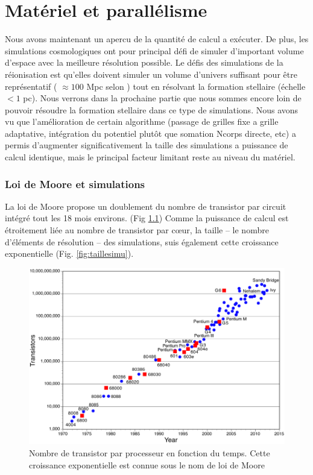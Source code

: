 \chapter{Matériel et parallélisme}

Nous avons maintenant un apercu de la quantité de calcul a exécuter.
De plus, les simulations cosmologiques ont pour principal défi de simuler d'important volume d'espace avec la meilleure résolution possible.
Le défis des simulations de la réionisation est qu'elles doivent simuler un volume d'univers suffisant pour être représentatif ( $\approx 100$ Mpc selon \cite{iliev_cosmological_2006}) tout en résolvant la formation stellaire (échelle $<1$ pc).
Nous verrons dans la prochaine partie que nous sommes encore loin de pouvoir résoudre la formation stellaire dans ce type de simulations. %
Nous avons vu que l'amélioration de certain algorithme (passage de grilles fixe a grille adaptative, intégration du potentiel plutôt que somation Ncorps directe, etc) a permis d'augmenter significativement la taille des simulations a puissance de calcul identique, mais le principal facteur limitant reste au niveau du matériel.

\subsection{Loi de Moore et simulations}
La loi de Moore \citep{moore1965cramming} propose un doublement du nombre de transistor par circuit intégré tout les 18 mois environs. (Fig \ref{fig:moore})
Comme la puissance de calcul est étroitement liée au nombre de transistor par cœur, la taille -- le nombre d'éléments de résolution -- des simulations, suis également cette croissance exponentielle (Fig. \ref{fig:taillesimu}).

\begin{figure}[bth]
        \includegraphics[width=.95\linewidth]{img/02/moorelaw.png} 
        \caption{Nombre de transistor par processeur en fonction du temps.
        Cette croissance exponentielle est connue sous le nom de loi de Moore}
 		\label{fig:moore}
\end{figure}

